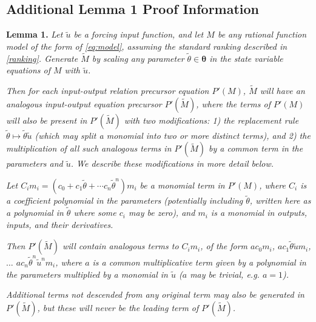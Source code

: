 \documentclass[a4paper,fleqn]{cas-dc}
\theoremstyle{definition}
\begin{document}
\vspace{1cm}

\subsection{Additional Lemma 1 Proof Information} \label{prop1proof}

\noindent \textbf{Lemma 1.} 
\textit{Let $\tilde{u}$ be a forcing input function, and let $M$ be any rational function model of the form of \cref{eq:model}, assuming the standard ranking described in \cref{ranking}. Generate $\tilde{M}$ by scaling any parameter $\tilde{\theta} \in \pmb{\theta}$ in the state variable equations of $M$ with $\tilde{u}$.}
     
\textit{Then for each input-output relation precursor equation $P'(M)$, $\tilde{M}$ will have an analogous input-output equation precursor $P'(\tilde{M})$, where the terms of $P'(M)$ will also be present in $P'(\tilde{M})$ with two modifications: 1) the replacement rule $\tilde{\theta} \mapsto \tilde{\theta}\tilde{u}$ (which may split a monomial into two or more distinct terms), and 2) the multiplication of all such analogous terms in $P'(\tilde{M})$ by a common term in the parameters and $\tilde{u}$. We describe these modifications in more detail below.}

\textit{Let $C_im_i = (c_0 + c_1\tilde{\theta} + \cdots c_n\tilde{\theta}^n)m_i$ be a monomial term in $P'(M)$, where $C_i$ is a coefficient polynomial in the parameters (potentially including $\tilde{\theta}$, written here as a polynomial in $\tilde{\theta}$ where some $c_i$ may be zero), and  $m_i$ is a monomial in outputs, inputs, and their derivatives. }

\textit{Then $P'(\tilde{M})$ will contain analogous terms to $C_im_i$, of the form $ac_0m_i$, $ac_1\tilde{\theta}\tilde{u}m_i$, $\dots$ $ac_n\tilde{\theta}^n\tilde{u}^nm_i$, where $a$ is a common multiplicative term given by a polynomial in the parameters multiplied by a monomial in $\tilde{u}$ ($a$ may be trivial, e.g. $a=1$).}

\textit{Additional terms not descended from any original term may also be generated in $P'(\tilde{M})$, but these will never be the leading term of $P'(\tilde{M})$.}

\vspace{0.2cm}
\end{document}
